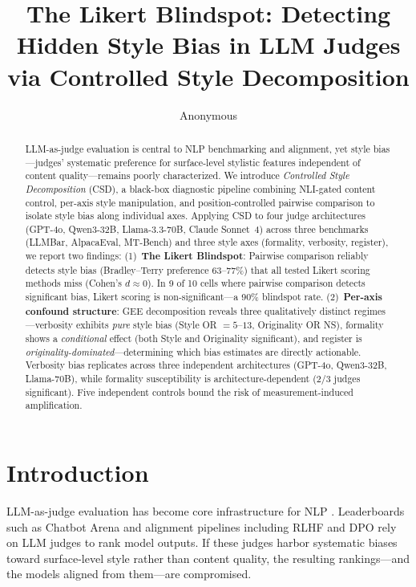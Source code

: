 \documentclass[11pt,a4paper]{article}
\title{The Likert Blindspot: Detecting Hidden Style Bias in LLM Judges\\via Controlled Style Decomposition}
\author{Anonymous}
\date{}
\newcommand{\csd}{\textsc{CSD}}
\begin{document}
\maketitle

\begin{abstract}
LLM-as-judge evaluation is central to NLP benchmarking and alignment, yet style bias---judges' systematic preference for surface-level stylistic features independent of content quality---remains poorly characterized.
We introduce \emph{Controlled Style Decomposition} (\csd{}), a black-box diagnostic pipeline combining NLI-gated content control, per-axis style manipulation, and position-controlled pairwise comparison to isolate style bias along individual axes.
Applying \csd{} to four judge architectures (GPT-4o, Qwen3-32B, Llama-3.3-70B, Claude Sonnet~4) across three benchmarks (LLMBar, AlpacaEval, MT-Bench) and three style axes (formality, verbosity, register), we report two findings:
(1)~\textbf{The Likert Blindspot}: Pairwise comparison reliably detects style bias (Bradley--Terry preference 63--77\%) that all tested Likert scoring methods miss (Cohen's $d \approx 0$). In 9 of 10 cells where pairwise comparison detects significant bias, Likert scoring is non-significant---a 90\% blindspot rate.
(2)~\textbf{Per-axis confound structure}: GEE decomposition reveals three qualitatively distinct regimes---verbosity exhibits \emph{pure} style bias (Style OR $= 5$--$13$, Originality OR NS), formality shows a \emph{conditional} effect (both Style and Originality significant), and register is \emph{originality-dominated}---determining which bias estimates are directly actionable.
Verbosity bias replicates across three independent architectures (GPT-4o, Qwen3-32B, Llama-70B), while formality susceptibility is architecture-dependent (2/3 judges significant). Five independent controls bound the risk of measurement-induced amplification.
\end{abstract}

\section{Introduction}

LLM-as-judge evaluation has become core infrastructure for NLP \citep{zheng2023judging,alpaca_eval,dubois2024alpacafarm}. Leaderboards such as Chatbot Arena \citep{chiang2024chatbot} and alignment pipelines including RLHF and DPO \citep{ouyang2022training,rafailov2023direct} rely on LLM judges to rank model outputs. If these judges harbor systematic biases toward surface-level style rather than content quality, the resulting rankings---and the models aligned from them---are compromised.
\end{document}
